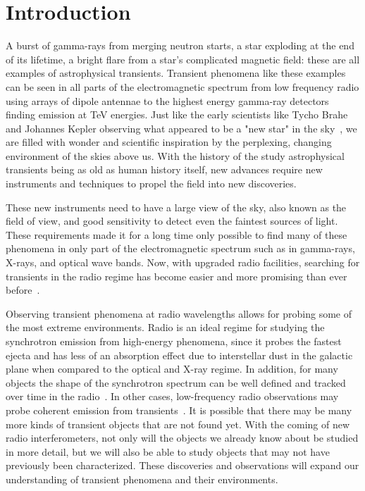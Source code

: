 \documentclass[12pt]{article}
\begin{document}
 \doublespacing
\setcounter{page}{1}
	\section{Introduction}
\label{introlabel}


A burst of gamma-rays from merging neutron starts, a star exploding at the end of its lifetime, a bright flare from a star's complicated magnetic field: these are all examples of astrophysical transients. Transient phenomena like these examples can be seen in all parts of the electromagnetic spectrum from low frequency radio using arrays of dipole antennae to the highest energy gamma-ray detectors finding emission at TeV energies. Just like the early scientists like Tycho Brahe and Johannes Kepler observing what appeared to be a "new star" in the sky~\citep{1969dnen.book.....B,1606dsnip.book.....K}, we are filled with wonder and scientific inspiration by the perplexing, changing environment of the skies above us. With the history of the study astrophysical transients being as old as human history itself, new advances require new instruments and techniques to propel the field into new discoveries. 

These new instruments need to have a large view of the sky, also known as the field of view, and good sensitivity to detect even the faintest sources of light. These requirements made it for a long time only possible to find many of these phenomena in only part of the electromagnetic spectrum such as in gamma-rays, X-rays, and optical wave bands. Now, with upgraded radio facilities, searching for transients in the radio regime has become easier and more promising than ever before~\citep{2011BASI...39..315F}.

Observing transient phenomena at radio wavelengths allows for probing some of the most extreme environments. Radio is an ideal regime for studying the synchrotron emission from high-energy phenomena, since it probes the fastest ejecta and has less of an absorption effect due to interstellar dust in the galactic plane when compared to the optical and X-ray regime. In addition, for many objects the shape of the synchrotron spectrum can be well defined and tracked over time in the radio~\citep{2014PASA...31....8G}. In other cases, low-frequency radio observations may probe coherent emission from transients~\citep{2015MNRAS.446.3687P}. It is possible that there may be many more kinds of transient objects that are not found yet. With the coming of new radio interferometers, not only will the objects we already know about be studied in more detail, but we will also be able to study objects that may not have previously been characterized. These discoveries and observations will expand our understanding of transient phenomena and their environments.
\end{document}
